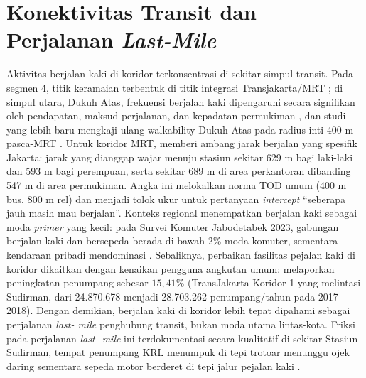 \documentclass[11pt,a4paper]{report}
\begin{document}
\section{Konektivitas Transit dan Perjalanan \textit{Last-Mile}}
Aktivitas berjalan kaki di koridor terkonsentrasi di sekitar simpul transit. Pada segmen 4,
titik keramaian terbentuk di titik integrasi Transjakarta/MRT \autocite{dwisadana2024}; di simpul
utara, Dukuh Atas, frekuensi berjalan kaki dipengaruhi secara signifikan oleh pendapatan, maksud
perjalanan, dan kepadatan permukiman \autocite{rakhmatulloh2020}, dan studi yang lebih baru
mengkaji ulang walkability Dukuh Atas pada radius inti 400 m pasca-MRT \autocite{napitupulu2025tod}.
Untuk koridor MRT, \textcite{afkara2020walking} memberi ambang jarak berjalan yang spesifik
Jakarta: jarak yang dianggap wajar menuju stasiun sekitar 629 m bagi laki-laki dan 593 m bagi
perempuan, serta sekitar 689 m di area perkantoran dibanding 547 m di area permukiman. Angka ini
melokalkan norma TOD umum (400 m bus, 800 m rel) dan menjadi tolok ukur untuk pertanyaan
\textit{intercept} ``seberapa jauh masih mau berjalan''. %
Konteks regional menempatkan berjalan kaki sebagai moda \emph{primer} yang kecil: pada Survei
Komuter Jabodetabek 2023, gabungan berjalan kaki dan bersepeda berada di bawah 2\% moda komuter,
sementara kendaraan pribadi mendominasi \autocite{goodstats2024}. %
Sebaliknya, perbaikan fasilitas pejalan kaki di koridor dikaitkan dengan kenaikan pengguna
angkutan umum: \textcite{mulyadi2022} melaporkan peningkatan penumpang sebesar \(15{,}41\%\)
(TransJakarta Koridor 1 yang melintasi Sudirman, dari 24.870.678 menjadi 28.703.262
penumpang/tahun pada 2017--2018). %
Dengan demikian, berjalan kaki di koridor lebih tepat dipahami sebagai perjalanan \textit{last-
mile} penghubung transit, bukan moda utama lintas-kota. Friksi pada perjalanan \textit{last-
mile} ini terdokumentasi secara kualitatif di sekitar Stasiun Sudirman, tempat penumpang KRL
menumpuk di tepi trotoar menunggu ojek daring sementara sepeda motor berderet di tepi jalur
pejalan kaki \autocite{kompas2025ojol}. %
\end{document}
